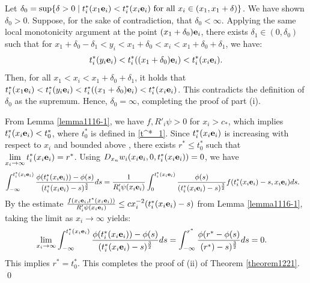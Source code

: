 \documentclass{amsart}
\numberwithin{equation}{section}
\begin{document}
 Let $\delta_0 = \sup\{ \delta > 0 \mid t_i^*(x_1 {\bf e}_i) < t_i^* (x_i {\bf e}_i) \text{ for all } x_i \in (x_1, x_1 + \delta) \}$. We have shown $\delta_0 > 0$. Suppose, for the sake of contradiction, that $\delta_0 < \infty$. Applying the same local monotonicity argument at the point $(x_1 + \delta_0) {\bf e}_i$, there exists $\delta_1 \in (0, \delta_0)$ such that for $x_1 +\delta_0 -\delta_1 < y_i < x_1 +\delta_0 < x_i < x_1 +\delta_0 + \delta_1$, we have:
\begin{equation*} %
t^*_i (y_i {\bf e}_i) < t^*_i((x_1 +\delta_0) {\bf e}_i) < t^*_i (x_i {\bf e}_i).
\end{equation*}
Then, for all $x_1 < x_i < x_1 + \delta_0 + \delta_1$, it holds that $t^*_i (x_1 {\bf e}_i) < t^*_i (y_i {\bf e}_i) < t^*_i((x_1 +\delta_0) {\bf e}_i) < t^*_i (x_i {\bf e}_i)$. This contradicts the definition of $\delta_0$ as the supremum. Hence, $\delta_0 = \infty$, completing the proof of part (i).
 
 
 
  



 




 From Lemma \ref{lemma1116-1}, we have $f, R'_i \psi > 0$ for $x_i > c_*$, 
which implies $t_i^* (x_i {\bf e}_i) < t^*_0 $,  where $t^*_0  $ is defined in \eqref{t^*_1}.  Since $ t^*_i(x_i{\bf e}_i)$ is increasing with respect to $x_i$ and bounded  above , there exists  $r^*  \leq t^*_0$ such that $\displaystyle \lim_{x_i \rightarrow \infty}  t_i^*(x_i{\bf e}_i) =  r^*$. Using   $D_{x_n} w_i (x_i {\bf e}_i, 0, t_i^* (x_i {\bf e}_i)) = 0$, we have 
\begin{align*}
\int_{-\infty}^{t^*_i  (x_i {\bf e}_i)} \frac{\phi(t^*_i (x_i {\bf e}_i)) -\phi(s)}{(t^*_i (x_i {\bf e}_i) -s)^{\frac{3}{2}}} ds 
& = \frac{1}{R'_i \psi (x_i {\bf e}_i)} \int_0^{t^*_i (x_i {\bf e}_i)} \frac{\phi(s)}{(t^*_i (x_i {\bf e}_i) -s)^{\frac{3}{2}}} f(t^*_i (x_i {\bf e}_i) -s, x_i {\bf e}_i) ds.
\end{align*}
By the estimate $\frac{f(x_i {\bf e}_i , t^*(x_i {\bf e}_i ) )}{R'_i \psi (x_i {\bf e}_i )} \leq c x_i^{-2} (t^*_i (x_i {\bf e}_i ) -s)$ from Lemma \ref{lemma1116-1}, taking the limit as $x_i \rightarrow \infty$ yields:
 \begin{align*}
\lim_{x_i \rightarrow \infty} \int_{-\infty}^{t^*_i (x_i {\bf e}_i)} \frac{\phi(t^*_i (x_i {\bf e}_i)) -\phi(s)}{(t^*_i (x_i {\bf e}_i) -s)^{\frac{3}{2}}} ds
= \int_{-\infty}^{r^*  } \frac{\phi(r^*  -\phi(s)}{(r^* ) -s)^{\frac{3}{2}}} ds & = 0.
\end{align*}
This implies $r^* = t^*_0$.    This completes the proof of (ii) of Theorem \ref{theorem1221}.
 \qed
\end{document}
